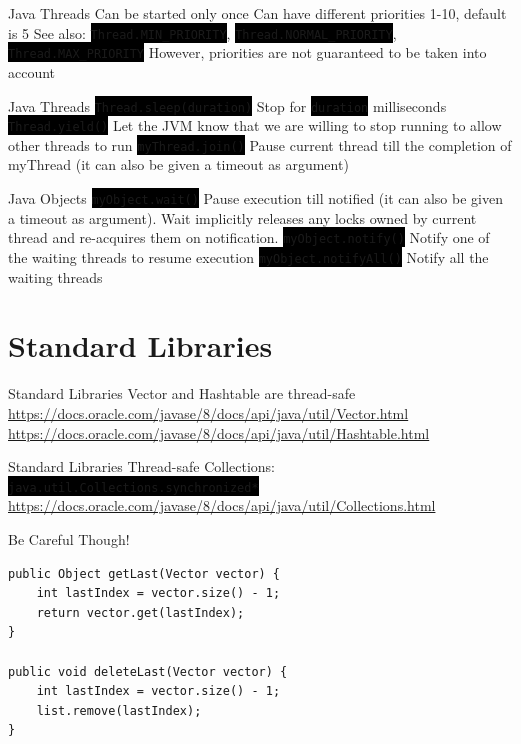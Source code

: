 \documentclass[
14pt,
aspectratio=169,
usenames,
dvipsnames,
x11names]{beamer}
\newcommand{\code}[1]{{\colorbox{black}{\color{green}\texttt{#1}}}}
\begin{document}
\begin{frame}{Java Threads}
  Can be started only once
  \vfill
  Can have different priorities 1-10, default is 5
  \vfill
  See also: \code{Thread.MIN\_PRIORITY}, \code{Thread.NORMAL\_PRIORITY}, \code{Thread.MAX\_PRIORITY}
  \vfill
  However, priorities are not guaranteed to be taken into account
\end{frame}

\begin{frame}{Java Threads}
  \code{Thread.sleep(duration)} Stop for \code{duration} milliseconds
  \vfill
  \code{Thread.yield()} Let the JVM know that we are willing to stop running to allow other threads to run
  \vfill
  \code{myThread.join()} Pause current thread till the completion of myThread (it can also be given a timeout as argument)
\end{frame}

\begin{frame}{Java Objects}
  \code{myObject.wait()} Pause execution till notified (it can also be given a timeout as argument). Wait implicitly releases any locks owned by current thread and re-acquires them on notification.
  \vfill
  \code{myObject.notify()} Notify one of the waiting threads to resume execution
  \vfill
  \code{myObject.notifyAll()} Notify all the waiting threads
\end{frame}

\section{Standard Libraries}

\begin{frame}{Standard Libraries}
  Vector and Hashtable are thread-safe
  \vfill
  \url{https://docs.oracle.com/javase/8/docs/api/java/util/Vector.html}
  \url{https://docs.oracle.com/javase/8/docs/api/java/util/Hashtable.html}
\end{frame}

\begin{frame}{Standard Libraries}
  Thread-safe Collections: \code{java.util.Collections.synchronized*}
  \vfill
  \url{https://docs.oracle.com/javase/8/docs/api/java/util/Collections.html}
\end{frame}

\begin{frame}[fragile]{Be Careful Though!}
\begin{lstlisting}
public Object getLast(Vector vector) {
    int lastIndex = vector.size() - 1;
    return vector.get(lastIndex);
}

public void deleteLast(Vector vector) {
    int lastIndex = vector.size() - 1;
    list.remove(lastIndex);
}
\end{lstlisting}
\end{frame}
\end{document}
